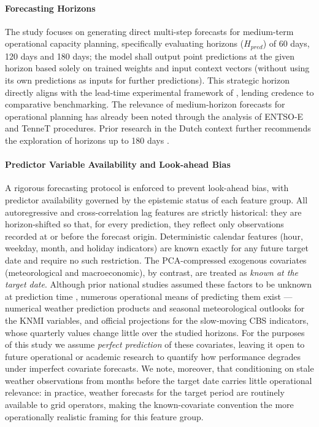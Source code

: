 \paragraph{Forecasting Horizons}
The study focuses on generating direct multi-step forecasts for medium-term operational capacity planning, specifically evaluating horizons ($H_{pred}$) of 60 days, 120 days and 180 days; the model shall output point predictions at the given horizon based solely on trained weights and input context vectors (without using its own predictions as inputs for further predictions). This strategic horizon directly aligns with the lead-time experimental framework of \cite{van_de_sande_enhancing_2024}, lending credence to comparative benchmarking. The relevance of medium-horizon forecasts for operational planning has already been noted through the analysis of ENTSO-E and TenneT procedures. Prior research in the Dutch context further recommends the exploration of horizons up to 180 days \cite{van_de_sande_enhancing_2024}.


\paragraph{Predictor Variable Availability and Look-ahead Bias}
A rigorous forecasting protocol is enforced to prevent look-ahead bias, with predictor availability governed by the epistemic status of each feature group. All autoregressive and cross-correlation lag features are strictly historical: they are horizon-shifted so that, for every prediction, they reflect only observations recorded at or before the forecast origin. Deterministic calendar features (hour, weekday, month, and holiday indicators) are known exactly for any future target date and require no such restriction. The PCA-compressed exogenous covariates (meteorological and macroeconomic), by contrast, are treated as \textit{known at the target date}. Although prior national studies assumed these factors to be unknown at prediction time \cite{ashtar_hybrid_2025,van_de_sande_enhancing_2024}, numerous operational means of predicting them exist --- numerical weather prediction products and seasonal meteorological outlooks for the KNMI variables, and official projections for the slow-moving CBS indicators, whose quarterly values change little over the studied horizons. For the purposes of this study we assume \textit{perfect prediction} of these covariates, leaving it open to future operational or academic research to quantify how performance degrades under imperfect covariate forecasts. We note, moreover, that conditioning on stale weather observations from months before the target date carries little operational relevance: in practice, weather forecasts for the target period are routinely available to grid operators, making the known-covariate convention the more operationally realistic framing for this feature group.

